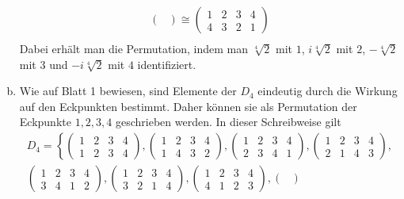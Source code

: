 \documentclass{article}
\begin{document}
\begin{enumerate}[(a)]
\begin{align*}
\begin{pmatrix}
            \end{pmatrix} \cong \begin{pmatrix}
                1 & 2 & 3 & 4\\
                4 & 3 & 2 & 1
            \end{pmatrix}\\
        \end{align*}
        Dabei erhält man die Permutation, indem man $\sqrt[4]{2}$ mit $1$, $i\sqrt[4]{2}$ mit $2$, $-\sqrt[4]{2}$ mit $3$ und $-i\sqrt[4]{2}$ mit $4$ identifiziert.
        \item Wie auf Blatt 1 bewiesen, sind Elemente der $D_4$ eindeutig durch die Wirkung auf den Eckpunkten bestimmt.
        Daher können sie als Permutation der Eckpunkte $1,2,3,4$ geschrieben werden. In dieser Schreibweise gilt
        \begin{multline*}
            D_4 = \left\{\begin{pmatrix}
                1 & 2 & 3 & 4\\
                1 & 2 & 3 & 4
            \end{pmatrix}, \begin{pmatrix}
                1 & 2 & 3 & 4\\
                1 & 4 & 3 & 2
            \end{pmatrix},\begin{pmatrix}
                1 & 2 & 3 & 4\\
                2 & 3 & 4 & 1
            \end{pmatrix},\begin{pmatrix}
                1 & 2 & 3 & 4\\
                2 & 1 & 4 & 3
            \end{pmatrix},\right.
            \\
            \left.\begin{pmatrix}
                1 & 2 & 3 & 4\\
                3 & 4 & 1 & 2
            \end{pmatrix},\begin{pmatrix}
                1 & 2 & 3 & 4\\
                3 & 2 & 1 & 4
            \end{pmatrix},\begin{pmatrix}
                1 & 2 & 3 & 4\\
                4 & 1 & 2 & 3
            \end{pmatrix},\begin{pmatrix}

\end{pmatrix}
\end{multline*}
\end{enumerate}
\end{document}
